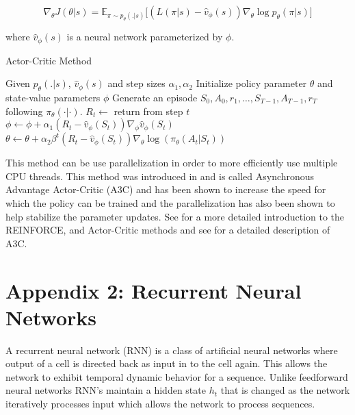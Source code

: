 \documentclass[12pt]{article}
\begin{document}
\begin{equation*}
  \nabla_\theta J(\theta|s)=\mathbb{E}_{\pi \sim p_\theta(.|s)}\bigg[ (L(\pi|s)-\hat{v}_\phi(s))\nabla_\theta \log p_\theta(\pi|s) \bigg]
\end{equation*}

where $\hat{v}_\phi(s)$ is a neural network parameterized by $\phi$.

\begin{algorithm}[H]
  \caption{Actor-Critic Method}
  \begin{algorithmic}[1]
    \Procedure{}{} Given $p_\theta(.|s)$, $\hat{v}_\phi(s)$ and step sizes $\alpha_1, \alpha_2$
    \State Initialize policy parameter $\theta$ and state-value parameters $\phi$
    \State Generate an episode $S_0, A_0, r_1,\dots,S_{T-1},A_{T-1},r_T$ following $\pi_\theta(\cdot|\cdot)$.
    \State $R_t \leftarrow $ return from step $t$
    \State $\phi \leftarrow \phi + \alpha_1 (R_t-\hat{v}_\phi(S_t) )\nabla_\phi\hat{v}_\phi(S_t)$
    \State $\theta \leftarrow \theta + \alpha_2 \beta^t (R_t-\hat{v}_\phi(S_t) )\nabla_\theta \log(\pi_\theta(A_t|S_t))$
    \EndFor
    \EndWhile
    \EndProcedure
  \end{algorithmic}
\end{algorithm}

This method can be use parallelization in order to more efficiently use multiple CPU threads. This method was introduced in
\citet{2016_Mnih} and is called Asynchronous Advantage Actor-Critic (A3C) and has been shown to increase the speed for which the policy can be trained and the parallelization has also been shown to help stabilize the parameter updates. See \citep{1998_Sutton} for a more detailed introduction to the REINFORCE, and Actor-Critic methods and see \citep{2016_Mnih} for a detailed description of A3C.

\section*{Appendix 2: Recurrent Neural Networks}

A recurrent neural network (RNN) is a class of artificial neural networks where output of a cell is directed back as input in to the cell again. This allows the network to exhibit temporal dynamic behavior for a sequence. Unlike feedforward neural networks RNN's maintain a hidden state $h_t$ that is changed as the network iteratively processes input which allows the network to process sequences.
\end{document}
